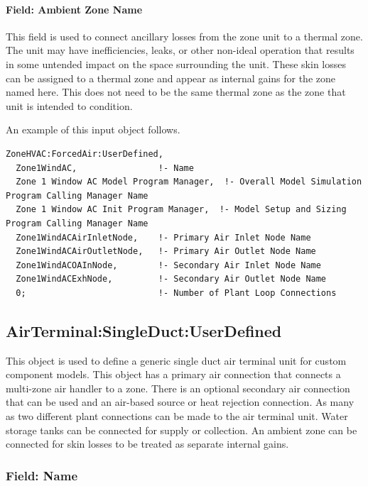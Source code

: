 \paragraph{Field: Ambient Zone Name}\label{field-ambient-zone-name}

This field is used to connect ancillary losses from the zone unit to a thermal zone. The unit may have inefficiencies, leaks, or other non-ideal operation that results in some untended impact on the space surrounding the unit. These skin losses can be assigned to a thermal zone and appear as internal gains for the zone named here. This does not need to be the same thermal zone as the zone that unit is intended to condition.

An example of this input object follows.

\begin{lstlisting}
ZoneHVAC:ForcedAir:UserDefined,
  Zone1WindAC,                !- Name
  Zone 1 Window AC Model Program Manager,  !- Overall Model Simulation Program Calling Manager Name
  Zone 1 Window AC Init Program Manager,  !- Model Setup and Sizing Program Calling Manager Name
  Zone1WindACAirInletNode,    !- Primary Air Inlet Node Name
  Zone1WindACAirOutletNode,   !- Primary Air Outlet Node Name
  Zone1WindACOAInNode,        !- Secondary Air Inlet Node Name
  Zone1WindACExhNode,         !- Secondary Air Outlet Node Name
  0;                          !- Number of Plant Loop Connections
\end{lstlisting}

\subsection{AirTerminal:SingleDuct:UserDefined}\label{airterminalsingleductuserdefined}

This object is used to define a generic single duct air terminal unit for custom component models. This object has a primary air connection that connects a multi-zone air handler to a zone. There is an optional secondary air connection that can be used and an air-based source or heat rejection connection. As many as two different plant connections can be made to the air terminal unit. Water storage tanks can be connected for supply or collection. An ambient zone can be connected for skin losses to be treated as separate internal gains.

\subsubsection{Field: Name}\label{field-name-1-046}

